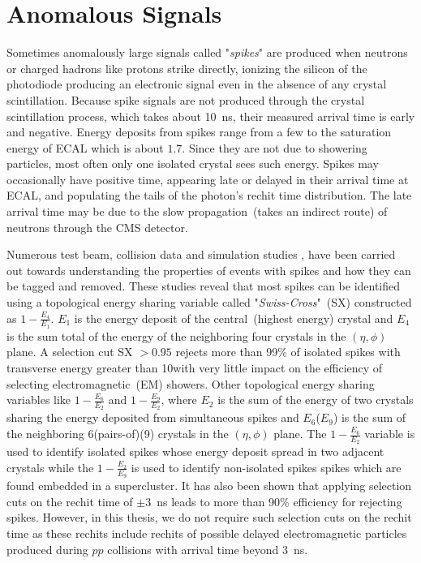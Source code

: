 \section{Anomalous Signals}\label{spikes}
Sometimes anomalously large signals called "\textit{spikes}" are produced when neutrons or charged hadrons like protons strike directly, ionizing the silicon of the photodiode  producing an electronic signal even in the absence of any crystal scintillation.
\newline
Because spike signals are not produced through the crystal scintillation process, which takes about 10~ns, their measured arrival time is early and negative. Energy deposits from spikes range from a few \GeV to the saturation energy of ECAL which is about $1.7$\TeV. Since they are not due to showering particles, most often only one isolated crystal sees such energy.  Spikes may occasionally have positive time, appearing late or delayed in their arrival time at ECAL, and populating the tails of the photon's rechit time distribution. The late arrival time may be due to the slow propagation~(takes an indirect route) of neutrons through the CMS detector. 
\par 
Numerous test beam, collision data and simulation studies \cite{spike,spike2}, have been carried out towards understanding the properties of events with spikes and how they can be tagged and removed. 
These studies reveal that most spikes can be identified using a topological energy sharing variable called "\textit{Swiss-Cross}"~(SX) constructed as $1 - \frac{E_{4}}{E_{1}}$. $E_{1}$ is the energy deposit of the central~(highest energy) crystal and $E_{4}$ is the sum total of the energy of the neighboring four crystals in the $(\eta , \phi)$ plane. A selection cut SX $ > 0.95$ rejects more than 99\% of isolated spikes with transverse energy greater than 10\GeV with very little impact on the efficiency of selecting electromagnetic~(EM) showers.
Other topological energy sharing variables like $ 1 - \frac{E_{6}}{E_{2}}$ and $ 1 - \frac{E_{9}}{E_{2}} $, where $E_{2}$ is the sum of the energy of two  crystals sharing the energy deposited from simultaneous spikes and $E_{6}$($E_{9}$) is the sum of the neighboring 6(pairs-of)(9) crystals in the $(\eta , \phi)$ plane. The $1 - \frac{E_{6}}{E_{2}} $ variable is used to identify isolated spikes whose energy deposit spread in two adjacent crystals while the  $ 1 - \frac{E_{2}}{E_{9}} $ is used to identify  non-isolated spikes \ie spikes which are found embedded in a supercluster.
\newline
It has also been shown that applying selection cuts on the rechit time of $ \pm 3$~ns leads to more than 90\% efficiency for rejecting spikes. However, in this thesis, we do not require such selection cuts on the rechit time as these rechits include rechits of possible delayed electromagnetic particles produced during $pp$ collisions with arrival time beyond 3~ns.

